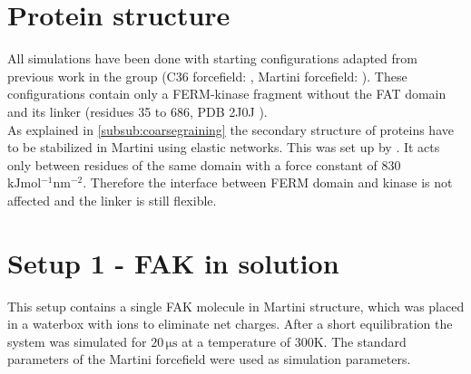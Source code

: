 \section{Protein structure}
All simulations have been done with starting configurations adapted from previous work in the group (C36 forcefield: \textcite{pap003}, Martini forcefield: \textcite{sara}). These configurations contain only a FERM-kinase fragment without the FAT domain and its linker (residues 35 to 686, PDB 2J0J \autocite{structFAK}).\\
As explained in \autoref{subsub:coarsegraining} the secondary structure of proteins have to be stabilized in Martini using elastic networks. This was set up by \textcite{sara}. It acts only between residues of the same domain with a force constant of 830 $\si{\kilo\joule\mole^{-1}\nano\meter^{-2}}$. Therefore the interface between FERM domain and kinase is not affected and the linker is still flexible.
\section{Setup 1 - FAK in solution}
\label{setup:setup1}
This setup contains a single FAK molecule in Martini structure, which was placed in a waterbox with ions to eliminate net charges. After a short equilibration the system was simulated for $20\,\si{\micro\second}$ at a temperature of $300\si{\kelvin}$. The standard parameters of the Martini forcefield were used as simulation parameters.
